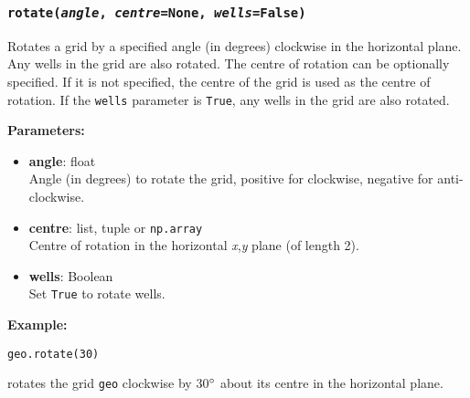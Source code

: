 \begin{snugshade}
\subsubsection{\texttt{rotate(\emph{angle}, \emph{centre}=\texttt{None}, \emph{wells}=\texttt{False})}}\end{snugshade}
\label{sec:mulgrid:rotate}

Rotates a grid by a specified angle (in degrees) clockwise in the horizontal plane.  Any wells in the grid are also rotated.  The centre of rotation can be optionally specified.  If it is not specified, the centre of the grid is used as the centre of rotation.  If the \texttt{wells} parameter is \texttt{True}, any wells in the grid are also rotated.

\textbf{Parameters:}
\begin{itemize}
  \item \textbf{angle}: float\\
    Angle (in degrees) to rotate the grid, positive for clockwise, negative for anti-clockwise.
  \item \textbf{centre}: list, tuple or \texttt{np.array}\\
    Centre of rotation in the horizontal \emph{x},\emph{y} plane (of length 2).
  \item \textbf{wells}: Boolean\\
    Set \texttt{True} to rotate wells.
\end{itemize}

\textbf{Example:}

\begin{lstlisting}
geo.rotate(30)
\end{lstlisting}

rotates the grid \texttt{geo} clockwise by 30$\degree$ about its centre in the horizontal plane.

